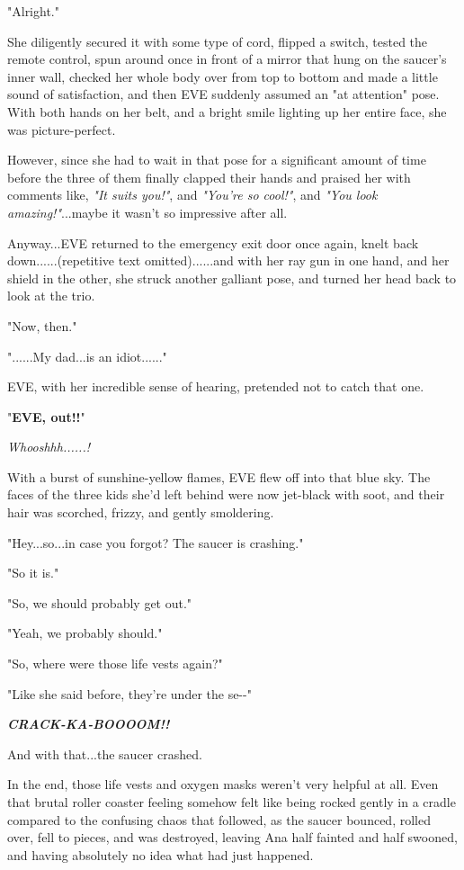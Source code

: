 \documentclass[
]{article}
\begin{document}
"Alright."

She diligently secured it with some type of cord, flipped a switch,
tested the remote control, spun around once in front of a mirror that
hung on the saucer's inner wall, checked her whole body over from top to
bottom and made a little sound of satisfaction, and then EVE suddenly
assumed an "at attention" pose. With both hands on her belt, and a
bright smile lighting up her entire face, she was picture-perfect.

However, since she had to wait in that pose for a significant amount of
time before the three of them finally clapped their hands and praised
her with comments like, \emph{"It suits you!"}, and \emph{"You're so
cool!"}, and \emph{"You look amazing!"}...maybe it wasn't so impressive
after all.

Anyway...EVE returned to the emergency exit door once again, knelt back
down......(repetitive text omitted)......and with her ray gun in one
hand, and her shield in the other, she struck another galliant pose, and
turned her head back to look at the trio.

"Now, then."

"......My dad...is an idiot......"

EVE, with her incredible sense of hearing, pretended not to catch that
one.

"\textbf{EVE, out!!}"

\emph{Whooshhh......!}

With a burst of sunshine-yellow flames, EVE flew off into that blue sky.
The faces of the three kids she'd left behind were now jet-black with
soot, and their hair was scorched, frizzy, and gently smoldering.

"Hey...so...in case you forgot? The saucer is crashing."

"So it is."

"So, we should probably get out."

"Yeah, we probably should."

"So, where were those life vests again?"

"Like she said before, they're under the se-\/-"

\emph{\textbf{CRACK-KA-BOOOOM!!}}

And with that...the saucer crashed.

In the end, those life vests and oxygen masks weren't very helpful at
all. Even that brutal roller coaster feeling somehow felt like being
rocked gently in a cradle compared to the confusing chaos that followed,
as the saucer bounced, rolled over, fell to pieces, and was destroyed,
leaving Ana half fainted and half swooned, and having absolutely no idea
what had just happened.
\end{document}

